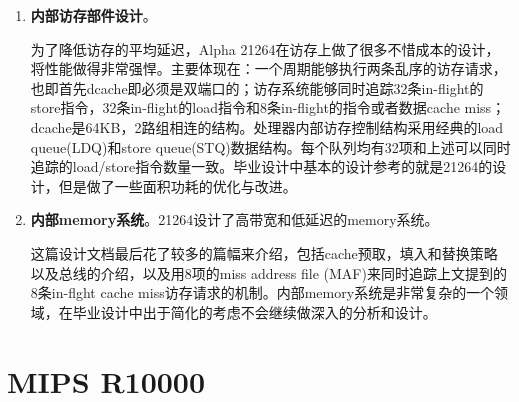 \begin{enumerate}[label=(\alph*)]
	\item \textbf{内部访存部件设计}。
	
	为了降低访存的平均延迟，Alpha 21264在访存上做了很多不惜成本的设计，将性能做得非常强悍。主要体现在：一个周期能够执行两条乱序的访存请求，也即首先dcache即必须是双端口的；访存系统能够同时追踪32条in-flight的store指令，32条in-flight的load指令和8条in-flight的指令或者数据cache miss；dcache是64KB，2路组相连的结构\citep{Alpha21264}。处理器内部访存控制结构采用经典的load queue(LDQ)和store queue(STQ)数据结构。每个队列均有32项和上述可以同时追踪的load/store指令数量一致\citep{Alpha21264}。毕业设计中基本的设计参考的就是21264的设计，但是做了一些面积功耗的优化与改进。
	\item \textbf{内部memory系统}。21264设计了高带宽和低延迟的memory系统。
	
	这篇设计文档最后花了较多的篇幅来介绍，包括cache预取，填入和替换策略以及总线的介绍，以及用8项的miss address file (MAF)来同时追踪上文提到的8条in-flght cache miss访存请求的机制。内部memory系统是非常复杂的一个领域，在毕业设计中出于简化的考虑不会继续做深入的分析和设计。
\end{enumerate}

\section{MIPS R10000}\label{subsec:r10000}


